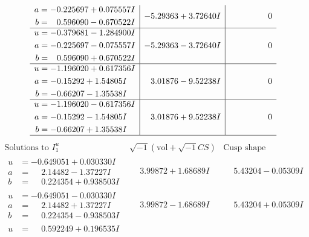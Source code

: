 \documentclass[1p]{elsarticle_modified}
\theoremstyle{definition}
\newcommand{\I}{\sqrt{-1}}
\begin{document}
$$\begin{array}{c|c|c}
\begin{aligned}
a &= -0.225697 + 0.075557 I \\
b &= \phantom{-}0.596090 - 0.670522 I\end{aligned}
 & -5.29363 + 3.72640 I & \phantom{-0.000000 } 0 \\ \hline\begin{aligned}
u &= -0.379681 - 1.284900 I \\
a &= -0.225697 - 0.075557 I \\
b &= \phantom{-}0.596090 + 0.670522 I\end{aligned}
 & -5.29363 - 3.72640 I & \phantom{-0.000000 } 0 \\ \hline\begin{aligned}
u &= -1.196020 + 0.617356 I \\
a &= -0.15292 + 1.54805 I \\
b &= -0.66207 - 1.35538 I\end{aligned}
 & \phantom{-}3.01876 - 9.52238 I & \phantom{-0.000000 } 0 \\ \hline\begin{aligned}
u &= -1.196020 - 0.617356 I \\
a &= -0.15292 - 1.54805 I \\
b &= -0.66207 + 1.35538 I\end{aligned}
 & \phantom{-}3.01876 + 9.52238 I & \phantom{-0.000000 } 0\\
 \hline 
 \end{array}$$\newpage$$\begin{array}{c|c|c}  
\text{Solutions to }I^u_{1}& \I (\text{vol} + \sqrt{-1}CS) & \text{Cusp shape}\\
 \hline 
\begin{aligned}
u &= -0.649051 + 0.030330 I \\
a &= \phantom{-}2.14482 - 1.37227 I \\
b &= \phantom{-}0.224354 + 0.938503 I\end{aligned}
 & \phantom{-}3.99872 + 1.68689 I & \phantom{-}5.43204 - 0.05309 I \\ \hline\begin{aligned}
u &= -0.649051 - 0.030330 I \\
a &= \phantom{-}2.14482 + 1.37227 I \\
b &= \phantom{-}0.224354 - 0.938503 I\end{aligned}
 & \phantom{-}3.99872 - 1.68689 I & \phantom{-}5.43204 + 0.05309 I \\ \hline\begin{aligned}
u &= \phantom{-}0.592249 + 0.196535 I \\

\end{aligned}
\end{array}$$
\end{document}
